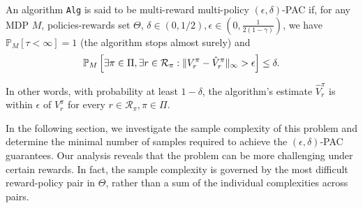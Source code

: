 \begin{definition}
    An algorithm {\tt Alg} is said to be multi-reward multi-policy $(\epsilon,\delta)$-PAC if, for any MDP $M$,  policies-rewards set $\Theta$, $\delta\in (0,1/2), \epsilon \in (0, \frac{1}{2(1-\gamma)})$, we have $\mathbb{P}_M[\tau<\infty]=1$ (the algorithm stops almost surely) and \begin{equation}
        \mathbb{P}_M\left[\exists\pi \in \Pi,\exists r\in {\cal R}_\pi: \|V_r^\pi - \hat V_r^\pi\|_\infty > \epsilon\right]\leq \delta.\end{equation}
\end{definition}
In other words, with probability at least $1-\delta$, the algorithm’s estimate $\hat{V}_r^\pi$ is within $\epsilon$ of $V_r^\pi$ for every  $r \in \mathcal{R}_\pi, \pi\in \Pi$.

In the following section, we investigate the sample complexity of this problem and determine the minimal number of samples required to achieve the $(\epsilon,\delta)$-PAC guarantees. Our analysis reveals that the problem  can be more challenging under certain rewards. In fact, the sample complexity is governed by the most difficult reward-policy pair in $\Theta$, rather than a sum of the individual complexities across pairs.